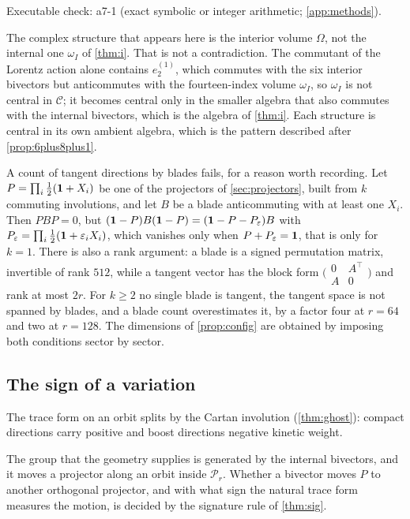 \noindent Executable check: a7-1 (exact symbolic or integer arithmetic; \cref{app:methods}).

The complex structure that appears here is the interior volume $\Omega$, not the internal one $\omega_I$ of \cref{thm:i}. That is
not a contradiction. The commutant of the Lorentz action alone contains $e^{(1)}_2$, which commutes with the six interior bivectors
but anticommutes with the fourteen-index volume $\omega_I$, so $\omega_I$ is not central in $\mathcal C$; it becomes central only in
the smaller algebra that also commutes with the internal bivectors, which is the algebra of \cref{thm:i}. Each structure is central
in its own ambient algebra, which is the pattern described after \cref{prop:6plus8plus1}.

\begin{remark}
\label{rem:noblade}
A count of tangent directions by blades fails, for a reason worth recording. Let $P=\prod_i\tfrac12(\mathbf 1+X_i)$ be one of the
projectors of \cref{sec:projectors}, built from $k$ commuting involutions, and let $B$ be a blade anticommuting with at least one
$X_i$. Then $PBP=0$, but $(\mathbf 1-P)B(\mathbf 1-P)=(\mathbf 1-P-P_\varepsilon)B$ with $P_\varepsilon=\prod_i\tfrac12(\mathbf 1+\varepsilon_iX_i)$, which
vanishes only when $P+P_\varepsilon=\mathbf 1$, that is only for $k=1$. There is also a rank argument: a blade is a signed permutation matrix,
invertible of rank $512$, while a tangent vector has the block form $\bigl(\begin{smallmatrix}0&A^{\!\top}\\A&0\end{smallmatrix}\bigr)$ and
rank at most $2r$. For $k\ge2$ no single blade is tangent, the tangent space is not spanned by blades, and a blade count
overestimates it, by a factor four at $r=64$ and two at $r=128$. The dimensions of \cref{prop:config} are obtained by imposing
both conditions sector by sector.
\end{remark}

\subsection{The sign of a variation}


The trace form on an orbit splits by the Cartan involution (\cref{thm:ghost}): compact directions carry positive and boost directions negative kinetic weight.

The group that the geometry supplies is generated by the internal bivectors, and it moves a projector along an orbit inside
$\mathcal P_r$. Whether a bivector moves $P$ to another orthogonal projector, and with what sign the natural trace form measures
the motion, is decided by the signature rule of \cref{thm:sig}.



